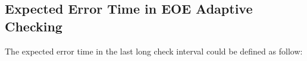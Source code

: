 \documentclass{sig-alternate}
\begin{document}

%
%
%
%
%





\appendix

  \subsection{Expected Error Time in EOE Adaptive Checking}
  \label{appendix}
The expected error time in the last long check interval could be defined as follow: 
\end{document}
